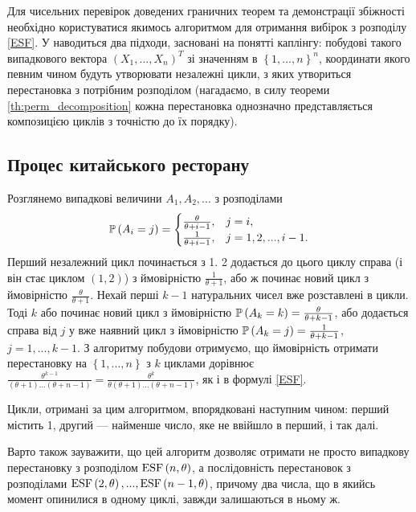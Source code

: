 Для чисельних перевірок доведених граничних теорем та демонстрації збіжності
необхідно користуватися якимось алгоритмом для отримання вибірок
з розподілу \eqref{ESF}. 
У \cite{Arratia} наводиться два підходи,
засновані на понятті каплінгу: побудові такого випадкового вектора
$\left(X_1, ..., X_n\right)^T$ зі значенням в
$\left\{1,...,n\right\}^n$, координати якого певним чином
будуть утворювати незалежні цикли, з яких утвориться перестановка
з потрібним розподілом (нагадаємо, в силу теореми \ref{th:perm_decomposition}
кожна перестановка однозначно представляється композицією циклів
з точністю до їх порядку). 

\subsection{Процес китайського ресторану}
Розглянемо випадкові величини $A_1, A_2, ...$ з розподілами
\begin{gather}\label{chinese_rest}
    \P{A_i = j} = \begin{cases}
        \frac{\theta}{\theta + i - 1}, & j = i, \\
        \frac{1}{\theta + i - 1}, & j = 1, 2, ..., i-1.
    \end{cases}
\end{gather}
Перший незалежний цикл починається з 1. 2 додається до цього циклу справа
(і він стає циклом $(1, 2)$) з ймовірністю $\frac{1}{\theta+1}$,
або ж починає новий цикл з ймовірністю $\frac{\theta}{\theta+1}$.
Нехай перші $k-1$ натуральних чисел вже розставлені в цикли.
Тоді $k$ або починає новий цикл з ймовірністю $\P{A_k = k} = \frac{\theta}{\theta + k - 1}$,
або додається справа від $j$ у вже наявний цикл з ймовірністю
$\P{A_k = j} = \frac{1}{\theta + k - 1}$, $j = 1,...,k-1$.
З алгоритму побудови отримуємо, що ймовірність отримати перестановку
на $\left\{1,...,n\right\}$
з $k$ циклами дорівнює
$\frac{\theta^{k-1}}{
    (\theta + 1) \dots (\theta + n - 1)
} = 
\frac{\theta^{k}}{
    \theta(\theta + 1) \dots (\theta + n - 1)
}
$, як і в формулі \eqref{ESF}.

Цикли, отримані за цим алгоритмом, впорядковані наступним чином:
перший містить 1, другий --- найменше число, яке не ввійшло в перший, і так далі.

Варто також зауважити, що цей алгоритм дозволяє отримати не просто
випадкову перестановку з розподілом $\ESF{n, \theta}$,
а послідовність перестановок з розподілами 
$\ESF{2, \theta}, ..., \ESF{n-1, \theta}$, причому два числа,
що в якийсь момент опинилися в одному циклі, завжди залишаються в ньому ж.

